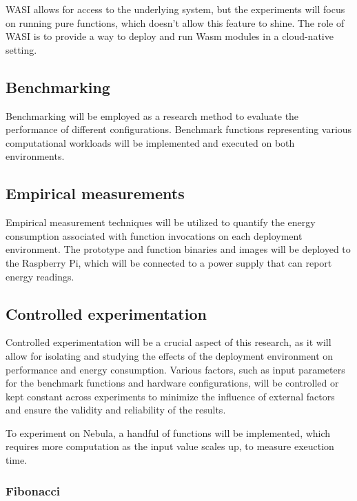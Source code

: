 \documentclass[
  table]{report}
\begin{document}
WASI allows for access to the underlying system, but the experiments
will focus on running pure functions, which doesn't allow this feature
to shine. The role of WASI is to provide a way to deploy and run
\ac{Wasm} modules in a cloud-native setting.

\subsection{Benchmarking}

Benchmarking will be employed as a research method to evaluate the
performance of different configurations. Benchmark functions
representing various computational workloads will be implemented and
executed on both environments.

\subsection{Empirical measurements}

Empirical measurement techniques will be utilized to quantify the energy
consumption associated with function invocations on each deployment
environment. The prototype and function binaries and images will be
deployed to the Raspberry Pi, which will be connected to a power supply
that can report energy readings.

\subsection{Controlled experimentation}

Controlled experimentation will be a crucial aspect of this research, as
it will allow for isolating and studying the effects of the deployment
environment on performance and energy consumption. Various factors, such
as input parameters for the benchmark functions and hardware
configurations, will be controlled or kept constant across experiments
to minimize the influence of external factors and ensure the validity
and reliability of the results.


To experiment on Nebula, a handful of functions will be implemented,
which requires more computation as the input value scales up, to measure
exeuction time.

\subsubsection*{Fibonacci}
\end{document}
